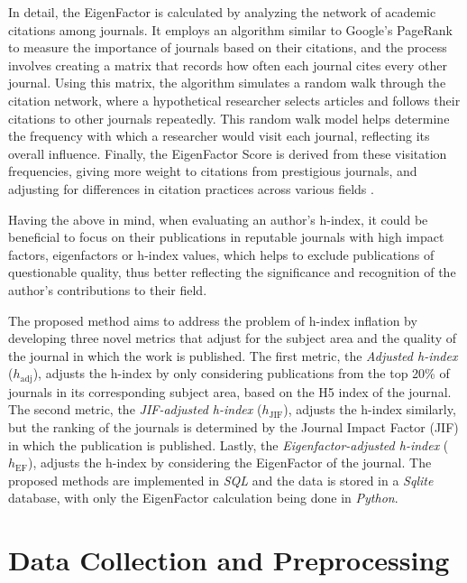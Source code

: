 In detail, the EigenFactor is calculated by analyzing the network of academic
citations among journals. It employs an algorithm similar to Google's PageRank
\cite{rogers2002google} to measure the importance of journals based on their
citations, and the process involves creating a matrix that records how often
each journal cites every other journal. Using this matrix, the algorithm
simulates a random walk through the citation network, where a hypothetical
researcher selects articles and follows their citations to other journals
repeatedly. This random walk model helps determine the frequency with which a
researcher would visit each journal, reflecting its overall influence. Finally,
the EigenFactor Score is derived from these visitation frequencies, giving more
weight to citations from prestigious journals, and adjusting for differences in
citation practices across various fields \cite{Bergstrom11433, Alan2009}.

Having the above in mind, when evaluating an author's h-index, it could be
beneficial to focus on their publications in reputable journals with high
impact factors, eigenfactors or h-index values, which helps to exclude
publications of questionable quality, thus better reflecting the significance
and recognition of the author's contributions to their field.

The proposed method aims to address the problem of h-index inflation by
developing three novel metrics that adjust for the subject area and the quality
of the journal in which the work is published. The first metric, the
\textit{Adjusted h-index} ($h_{\text{adj}}$), adjusts the h-index by only
considering publications from the top 20\% of journals in its corresponding
subject area, based on the H5 index of the journal. The second metric, the
\textit{JIF-adjusted h-index} ($h_{\text{JIF}}$), adjusts the h-index
similarly, but the ranking of the journals is determined by the Journal Impact
Factor (JIF) in which the publication is published. Lastly, the
\textit{Eigenfactor-adjusted h-index} ($h_{\text{EF}}$), adjusts the h-index by
considering the EigenFactor of the journal. The proposed methods are
implemented in \emph{SQL} and the data is stored in a \emph{Sqlite} database,
with only the EigenFactor calculation being done in \emph{Python}.

\section{Data Collection and Preprocessing}

